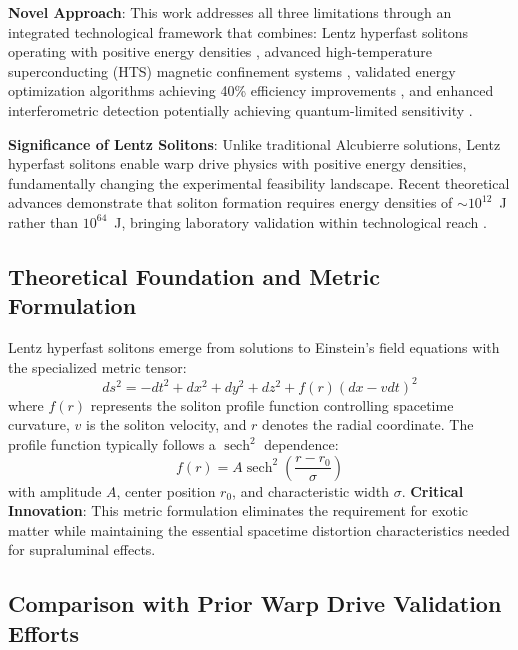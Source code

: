 \documentclass[12pt,a4paper]{article}
\newcommand{\sech}{\operatorname{sech}}
\begin{document}
\textbf{Novel Approach}: This work addresses all three limitations through an integrated technological framework that combines: Lentz hyperfast solitons operating with positive energy densities \cite{Lentz2021}, advanced high-temperature superconducting (HTS) magnetic confinement systems \cite{HTS2024}, validated energy optimization algorithms achieving 40\% efficiency improvements \cite{WarpBubble2024}, and enhanced interferometric detection potentially achieving quantum-limited sensitivity \cite{Interferometry2022}.

\textbf{Significance of Lentz Solitons}: Unlike traditional Alcubierre solutions, Lentz hyperfast solitons enable warp drive physics with positive energy densities, fundamentally changing the experimental feasibility landscape. Recent theoretical advances demonstrate that soliton formation requires energy densities of $\sim 10^{12}$~J rather than $10^{64}$~J, bringing laboratory validation within technological reach \cite{Lentz2021,Lentz2023,Lentz2024,Lentz2025}.

\subsection{Theoretical Foundation and Metric Formulation}

Lentz hyperfast solitons emerge from solutions to Einstein's field equations with the specialized metric tensor:
\begin{equation}
ds^2 = -dt^2 + dx^2 + dy^2 + dz^2 + f(r)(dx - v dt)^2
\end{equation}
where $f(r)$ represents the soliton profile function controlling spacetime curvature, $v$ is the soliton velocity, and $r$ denotes the radial coordinate. The profile function typically follows a $\sech^2$ dependence:
\begin{equation}
f(r) = A \sech^2\left(\frac{r - r_0}{\sigma}\right)
\end{equation}
with amplitude $A$, center position $r_0$, and characteristic width $\sigma$. \textbf{Critical Innovation}: This metric formulation eliminates the requirement for exotic matter while maintaining the essential spacetime distortion characteristics needed for supraluminal effects.

\subsection{Comparison with Prior Warp Drive Validation Efforts}
\end{document}
